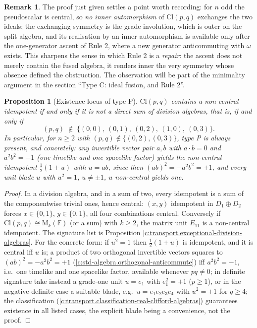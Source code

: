 \documentclass[11pt]{article}
\newtheorem{proposition}[theorem]{Proposition}
\theoremstyle{definition}
\newtheorem{remark}[theorem]{Remark}
\theoremstyle{plain}
\providecommand{\Cl}{}\renewcommand{\Cl}{\mathrm{Cl}}
\providecommand{\Mat}{}\renewcommand{\Mat}{\mathrm{M}}
\begin{document}
\begin{remark}\label{c:note.transport.typec-depth}
The proof just given settles a point worth recording: for $n$ odd the pseudoscalar is central, so \emph{no inner automorphism} of $\Cl(p,q)$ exchanges the two ideals; the exchanging symmetry is the grade involution, which is outer on the split algebra, and its realisation by an inner automorphism is available only after the one-generator ascent of Rule 2, where a new generator anticommuting with $\omega$ exists. This sharpens the sense in which Rule 2 is a \emph{repair}: the ascent does not merely contain the fused algebra, it renders inner the very symmetry whose absence defined the obstruction. The observation will be part of the minimality argument in the section ``Type C: ideal fusion, and Rule 2''.
\end{remark}

\begin{proposition}[Existence locus of type P]\label{c:transport.existence-locus-type-p}
$\Cl(p,q)$ contains a non-central idempotent if and only if it is not a direct sum of division algebras, that is, if and only if
\[
(p,q) \;\notin\; \{(0,0),\ (0,1),\ (0,2),\ (1,0),\ (0,3)\} .
\]
In particular, for $n \geq 2$ with $(p,q) \notin \{(0,2), (0,3)\}$, type P is always present, and concretely: any invertible vector pair $a, b$ with $a \cdot b = 0$ and $a^2 b^2 = -1$ (one timelike and one spacelike factor) yields the non-central idempotent $\tfrac12(1 + u)$ with $u = ab$, since then $(ab)^2 = -a^2b^2 = +1$, and every unit blade $u$ with $u^2 = 1$, $u \neq \pm 1$, $u$ non-central yields one.
\end{proposition}
\begin{proof}
In a division algebra, and in a sum of two, every idempotent is a sum of the componentwise trivial ones, hence central: $(x,y)$ idempotent in $D_1 \oplus D_2$ forces $x \in \{0,1\}$, $y \in \{0,1\}$, all four combinations central. Conversely if $\Cl(p,q) \cong \Mat_k(\mathbb{F})$ (or a sum) with $k \geq 2$, the matrix unit $E_{11}$ is a non-central idempotent. The signature list is Proposition \ref{c:transport.exceptional-division-algebras}. For the concrete form: if $u^2 = 1$ then $\tfrac12(1+u)$ is idempotent, and it is central iff $u$ is; a product of two orthogonal invertible vectors squares to $(ab)^2 = -a^2b^2 = +1$ (\ref{c:std-algebra.orthogonal-anticommute}) iff $a^2 b^2 = -1$, i.e.\ one timelike and one spacelike factor, available whenever $pq \neq 0$; in definite signature take instead a grade-one unit $u = e_1$ with $e_1^2 = +1$ ($p \geq 1$), or in the negative-definite case a suitable blade, e.g.\ $u = e_1e_2e_3e_4$ with $u^2 = +1$ for $q \geq 4$; the classification (\ref{c:transport.classification-real-clifford-algebras}) guarantees existence in all listed cases, the explicit blade being a convenience, not the proof.

\end{proof}
\end{document}
